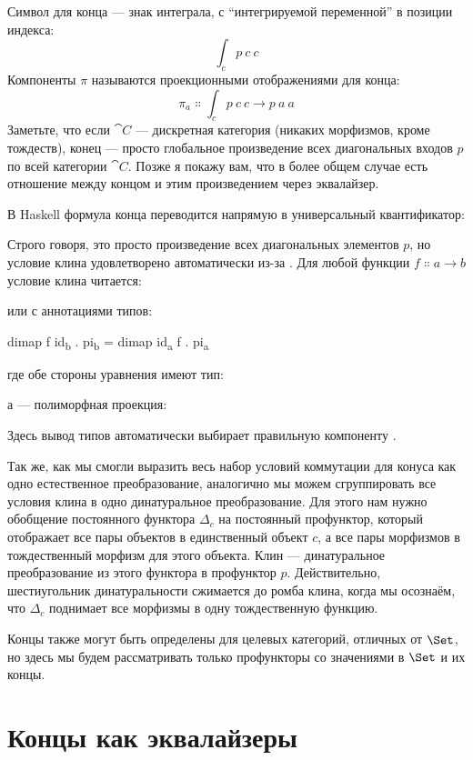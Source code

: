 \noindent
Символ для конца --- знак интеграла, с ``интегрируемой
переменной'' в позиции индекса:
\[\int_c p\ c\ c\]
Компоненты $\pi$ называются проекционными отображениями для конца:
\[\pi_a \Colon \int_c p\ c\ c \to p\ a\ a\]
Заметьте, что если $\cat{C}$ --- дискретная категория (никаких морфизмов, кроме
тождеств), конец --- просто глобальное произведение всех диагональных входов
$p$ по всей категории $\cat{C}$. Позже я покажу вам,
что в более общем случае есть отношение между концом
и этим произведением через эквалайзер.

В Haskell формула конца переводится напрямую в универсальный
квантификатор:

Строго говоря, это просто произведение всех диагональных элементов
$p$, но условие клина удовлетворено автоматически из-за
. Для любой функции
$f \Colon a \to b$ условие клина читается:

или с аннотациями типов:

\begin{snipv}
dimap f id\textsubscript{b} . pi\textsubscript{b} = dimap id\textsubscript{a} f . pi\textsubscript{a}
\end{snipv}
где обе стороны уравнения имеют тип:

а  --- полиморфная проекция:

Здесь вывод типов автоматически выбирает правильную компоненту
.

Так же, как мы смогли выразить весь набор условий коммутации
для конуса как одно естественное преобразование, аналогично мы можем сгруппировать все
условия клина в одно динатуральное преобразование. Для этого нам нужно
обобщение постоянного функтора $\Delta_c$ на постоянный
профунктор, который отображает все пары объектов в единственный объект $c$,
а все пары морфизмов в тождественный морфизм для этого объекта.
Клин --- динатуральное преобразование из этого функтора в профунктор
$p$. Действительно, шестиугольник динатуральности сжимается до ромба
клина, когда мы осознаём, что $\Delta_c$ поднимает все морфизмы в одну
тождественную функцию.

Концы также могут быть определены для целевых категорий, отличных от $\Set$,
но здесь мы будем рассматривать только профункторы со значениями в $\Set$ и их
концы.

\section{Концы как эквалайзеры}

